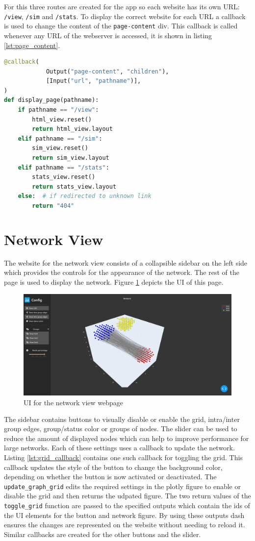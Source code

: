 For this three routes are created for the app so each website has its own URL: \texttt{/view},
\texttt{/sim} and \texttt{/stats}. To display the correct website for each URL a callback 
is used to change the content of the \texttt{page-content} div. This callback is called
whenever any URL of the webserver is accessed, it is shown in listing \ref{lst:page_content}.
\begin{lstlisting}[language=python, caption={Create callback for page content}, label={lst:page_content}]
@callback(
            Output("page-content", "children"),
            [Input("url", "pathname")],
)
def display_page(pathname):
    if pathname == "/view":
        html_view.reset()
        return html_view.layout
    elif pathname == "/sim":
        sim_view.reset()
        return sim_view.layout
    elif pathname == "/stats":
        stats_view.reset()
        return stats_view.layout
    else:  # if redirected to unknown link
        return "404"
\end{lstlisting}

\section{Network View}
The website for the network view consists of a collapsible sidebar on the left side which provides the
controls for the appearance of the network. The rest of the page is used to display the 
network. Figure \ref{fig:web_network_view} depicts the UI of this page.

\begin{figure}
    \centering
    \includegraphics[width=0.5\linewidth]{images/web_network_view.png}
    \caption{UI for the network view webpage}
    \label{fig:web_network_view}
\end{figure}

The sidebar contains buttons to visually disable or enable the grid, intra/inter group edges, group/status color or 
groups of nodes. The slider can be used to reduce the amount of displayed nodes which 
can help to improve performance for large networks. Each of these settings uses a callback
to update the network. Listing \ref{lst:grid_callback} contains one such callback for toggling the grid. This
callback updates the style of the button to change the background color, depending on
whether the button is now activated or deactivated. The \texttt{update\_graph\_grid} edits
the required settings in the plotly figure to enable or disable the grid and then returns
the udpated figure. The two return values of the \texttt{toggle\_grid} function are passed
to the specified outputs which contain the ids of the UI elements for the button and network
figure. By using these outputs dash ensures the changes are represented on the website without
needing to reload it. Similar callbacks are created for the other buttons and the slider.

